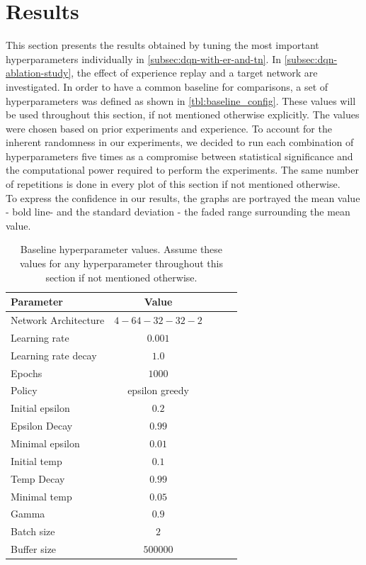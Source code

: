 \documentclass{article}
\begin{document}
\section{Results}
\label{sec:results}
This section presents the results obtained by tuning the most important hyperparameters individually in \autoref{subsec:dqn-with-er-and-tn}. 
In \autoref{subsec:dqn-ablation-study}, the effect of experience replay and a target network are investigated.
In order to have a common baseline for comparisons, a set of hyperparameters was defined as shown in \autoref{tbl:baseline_config}. 
These values will be used throughout this section, if not mentioned otherwise explicitly.
The values were chosen based on prior experiments and experience.
To account for the inherent randomness in our experiments,
we decided to run each combination of hyperparameters five times as a compromise between statistical significance and the computational power required to perform the experiments. The same number of repetitions is done in every plot of this section if not mentioned otherwise.\\
To express the confidence in our results, the graphs are portrayed the mean value - bold line- and the standard deviation - the faded range surrounding the mean value. 

\begin{table}[ht]
   \caption{Baseline hyperparameter values. Assume these values for any hyperparameter throughout this section if not mentioned otherwise.}
   \label{tbl:baseline_config}
   \vskip 0.15in
   \begin{center}
   \begin{small}
   \begin{sc}
   \begin{tabular}{lcccr}
   \toprule
   Parameter & Value \\
   \midrule
   Network Architecture    & $4-64-32-32-2$ \\
   Learning rate           & $0.001$ \\
   Learning rate decay     & $1.0$   \\
   Epochs                  & $1000$ \\
   Policy                  & epsilon greedy \\
   Initial epsilon         & $0.2$ \\
   Epsilon Decay           & $0.99$ \\
   Minimal epsilon         & $0.01$ \\
   Initial temp            & $0.1$ \\
   Temp Decay              & $0.99$ \\
   Minimal temp            & $0.05$ \\
   Gamma                   & $0.9$ \\
   Batch size              & $2$ \\
   Buffer size             & $500000$ \\
   \bottomrule
   \end{tabular}
   \end{sc}
   \end{small}
   \end{center}
   \vskip -0.1in
\end{table}
\end{document}
